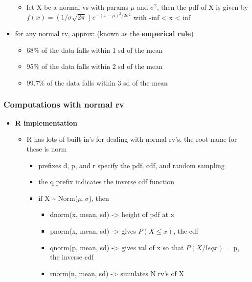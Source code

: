 \documentclass[
]{article}
\providecommand{\tightlist}{%
  \setlength{\itemsep}{0pt}\setlength{\parskip}{0pt}}
\begin{document}
\begin{itemize}
  \begin{itemize}
  \tightlist
  \item
    let X be a normal vs with params \(\mu\) and \(\sigma^2\), then the
    pdf of X is given by
    \(f(x) = (1/\sigma\sqrt{2\pi})e^{-(x-\mu)^2/2\sigma^2}\) with -inf
    \textless{} x \textless{} inf
  \end{itemize}
\item
  for any normal rv, approx: (known as the \textbf{emperical rule})

  \begin{itemize}
  \tightlist
  \item
    68\% of the data falls within 1 sd of the mean
  \item
    95\% of the data falls within 2 sd of the mean
  \item
    99.7\% of the data falls within 3 sd of the mean
  \end{itemize}
\end{itemize}

\hypertarget{computations-with-normal-rv}{%
\subsubsection{Computations with normal
rv}\label{computations-with-normal-rv}}

\begin{itemize}
\tightlist
\item
  \textbf{R implementation}

  \begin{itemize}
  \tightlist
  \item
    R has lots of built-in's for dealing with normal rv's, the root name
    for these is norm

    \begin{itemize}
    \tightlist
    \item
      prefixes d, p, and r specify the pdf, cdf, and random sampling
    \item
      the q prefix indicates the inverse cdf function
    \item
      if X \textasciitilde{} Norm(\(\mu, \sigma\)), then

      \begin{itemize}
      \tightlist
      \item
        dnorm(x, mean, sd) -\textgreater{} height of pdf at x
      \item
        pnorm(x, mean, sd) -\textgreater{} gives \(P(X \leq x)\), the
        cdf
      \item
        qnorm(p, mean, sd) -\textgreater{} gives val of x so that
        \(P(X /leq x)\) = p, the inverse cdf
      \item
        rnorm(n, mean, sd) -\textgreater{} simulates N rv's of X
      \end{itemize}
    \end{itemize}
  \end{itemize}
\end{itemize}
\end{document}
